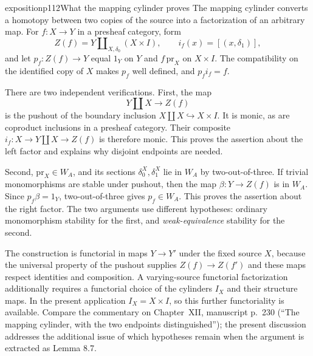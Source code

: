 \begin{dcomment}{exposition}{p112}{What the mapping cylinder proves}
The mapping cylinder converts a homotopy between two copies of the source into a factorization of an arbitrary map. For $f:X\to Y$ in a presheaf category, form
\[
 Z(f)=Y\amalg_{X,\delta_0}(X\times I),
 \qquad i_f(x)=[(x,\delta_1)],
\]
and let $p_f:Z(f)\to Y$ equal $1_Y$ on $Y$ and $f\,\mathrm{pr}_X$ on $X\times I$. The compatibility on the identified copy of $X$ makes $p_f$ well defined, and $p_fi_f=f$.

There are two independent verifications. First, the map
\[
 Y\amalg X\longrightarrow Z(f)
\]
is the pushout of the boundary inclusion $X\amalg X\hookrightarrow X\times I$. It is monic, as are coproduct inclusions in a presheaf category. Their composite $i_f:X\to Y\amalg X\to Z(f)$ is therefore monic. This proves the assertion about the left factor and explains why disjoint endpoints are needed.

Second, $\mathrm{pr}_X\in W_A$, and its sections $\delta_0^X,\delta_1^X$ lie in $W_A$ by two-out-of-three. If trivial monomorphisms are stable under pushout, then the map $\beta:Y\to Z(f)$ is in $W_A$. Since $p_f\beta=1_Y$, two-out-of-three gives $p_f\in W_A$. This proves the assertion about the right factor. The two arguments use different hypotheses: ordinary monomorphism stability for the first, and \emph{weak-equivalence} stability for the second.

The construction is functorial in maps $Y\to Y'$ under the fixed source $X$, because the universal property of the pushout supplies $Z(f)\to Z(f')$ and these maps respect identities and composition. A varying-source functorial factorization additionally requires a functorial choice of the cylinders $I_X$ and their structure maps. In the present application $I_X=X\times I$, so this further functoriality is available. Compare the commentary on Chapter~XII, manuscript p.~230 (``The mapping cylinder, with the two endpoints distinguished''); the present discussion addresses the additional issue of which hypotheses remain when the argument is extracted as Lemma 8.7.
\end{dcomment}

